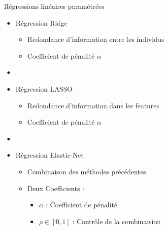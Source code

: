 \documentclass{beamer}
\begin{document}
\begin{frame}{Régressions linéaires paramétrées}
  \begin{itemize}
    \item Régression Ridge
    \begin{itemize}
      \item Redondance d'information entre les individus
      \item Coefficient de pénalité $\alpha$
    \end{itemize}
    \item[]
    \item Régression LASSO
    \begin{itemize}
      \item Redondance d'information dans les features
      \item Coefficient de pénalité $\alpha$
    \end{itemize}
    \item[]
    \item Régression Elastic-Net
    \begin{itemize}
      \item Combinaison des méthodes précédentes
      \item Deux Coefficients :
      \begin{itemize}
        \item $\alpha$ : Coefficient de pénalité
        \item $\rho \in [0,1]$ : Contrôle de la combinaision
      \end{itemize}
    \end{itemize}
  \end{itemize}
\end{frame}
\end{document}
